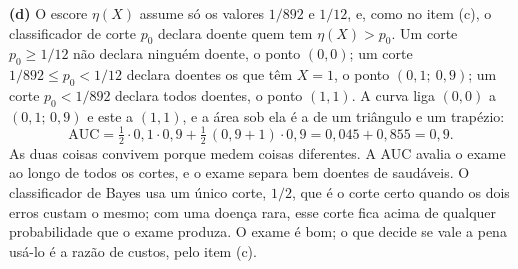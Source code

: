 \begin{solucao}
\smallskip
\textbf{(d)} O escore $\eta(X)$ assume só os valores $1/892$ e $1/12$, e, como no item (c), o
classificador de corte $p_0$ declara doente quem tem $\eta(X)>p_0$. Um corte $p_0\ge1/12$ não
declara ninguém doente, o ponto $(0,0)$; um corte $1/892\le p_0<1/12$ declara doentes os que
têm $X=1$, o ponto $(0{,}1;\ 0{,}9)$; um corte $p_0<1/892$ declara todos doentes, o ponto
$(1,1)$. A curva liga $(0,0)$ a $(0{,}1;\,0{,}9)$ e este a $(1,1)$, e a área sob ela é a
de um triângulo e um trapézio:
\[
  \mathrm{AUC}=\tfrac12\cdot0{,}1\cdot0{,}9+\tfrac12\,(0{,}9+1)\cdot0{,}9=0{,}045+0{,}855=0{,}9 .
\]
As duas coisas convivem porque medem coisas diferentes. A AUC avalia o exame ao longo de
todos os cortes, e o exame separa bem doentes de saudáveis. O classificador de Bayes usa um
único corte, $1/2$, que é o corte certo quando os dois erros custam o mesmo; com uma doença
rara, esse corte fica acima de qualquer probabilidade que o exame produza. O exame é bom; o
que decide se vale a pena usá-lo é a razão de custos, pelo item (c).
\end{solucao}
